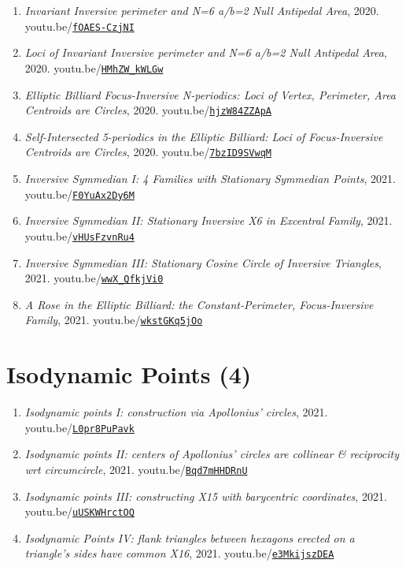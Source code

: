 \documentclass[12pt]{article}
\begin{document}
\begin{enumerate}[resume]
\item \textit{Invariant Inversive perimeter and N=6 a/b=2 Null Antipedal Area}, 2020. youtu.be/\href{https://youtu.be/fOAES-CzjNI}{\nolinkurl{fOAES-CzjNI}}
\item \textit{Loci of Invariant Inversive perimeter and N=6 a/b=2 Null Antipedal Area}, 2020. youtu.be/\href{https://youtu.be/HMhZW_kWLGw}{\nolinkurl{HMhZW\_kWLGw}}
\item \textit{Elliptic Billiard Focus-Inversive N-periodics: Loci of Vertex, Perimeter, Area Centroids are Circles}, 2020. youtu.be/\href{https://youtu.be/hjzW84ZZApA}{\nolinkurl{hjzW84ZZApA}}
\item \textit{Self-Intersected 5-periodics in the Elliptic Billiard: Loci of Focus-Inversive Centroids are Circles}, 2020. youtu.be/\href{https://youtu.be/7bzID9SVwqM}{\nolinkurl{7bzID9SVwqM}}
\item \textit{Inversive Symmedian I: 4 Families with Stationary Symmedian Points}, 2021. youtu.be/\href{https://youtu.be/F0YuAx2Dy6M}{\nolinkurl{F0YuAx2Dy6M}}
\item \textit{Inversive Symmedian II: Stationary Inversive X6 in Excentral Family}, 2021. youtu.be/\href{https://youtu.be/vHUsFzvnRu4}{\nolinkurl{vHUsFzvnRu4}}
\item \textit{Inversive Symmedian III: Stationary Cosine Circle of Inversive Triangles}, 2021. youtu.be/\href{https://youtu.be/wwX_QfkjVi0}{\nolinkurl{wwX\_QfkjVi0}}
\item \textit{A Rose in the Elliptic Billiard: the Constant-Perimeter, Focus-Inversive Family}, 2021. youtu.be/\href{https://youtu.be/wkstGKq5jOo}{\nolinkurl{wkstGKq5jOo}}
\end{enumerate}

\section{Isodynamic Points (4)}

\begin{enumerate}[resume]
\item \textit{Isodynamic points I: construction via Apollonius' circles}, 2021. youtu.be/\href{https://youtu.be/L0pr8PuPavk}{\nolinkurl{L0pr8PuPavk}}
\item \textit{Isodynamic points II: centers of Apollonius' circles are collinear \& reciprocity wrt circumcircle}, 2021. youtu.be/\href{https://youtu.be/Bqd7mHHDRnU}{\nolinkurl{Bqd7mHHDRnU}}
\item \textit{Isodynamic points III: constructing X15 with barycentric coordinates}, 2021. youtu.be/\href{https://youtu.be/uUSKWHrctOQ}{\nolinkurl{uUSKWHrctOQ}}
\item \textit{Isodynamic Points IV: flank triangles between hexagons erected on a triangle's sides have common X16}, 2021. youtu.be/\href{https://youtu.be/e3MkijszDEA}{\nolinkurl{e3MkijszDEA}}
\end{enumerate}
\end{document}
